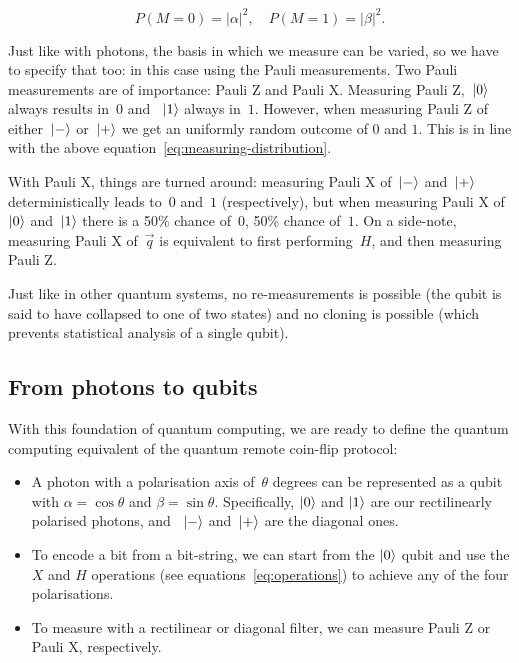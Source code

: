 \documentclass[oneside,a4paper]{article}
\begin{document}
\begin{equation}
    \label{eq:measuring-distribution}
    P(M=0) = |\alpha|^2,
    \quad P(M=1) = |\beta|^2.
\end{equation}

Just like with photons, the basis in which we measure can be varied, so we have to specify that too: in this case using the Pauli measurements. 
Two Pauli measurements are of importance: Pauli Z and Pauli X.
Measuring Pauli Z,~$\ket{0}$ always results in~$0$ and ~$\ket{1}$ always in~$1$.
However, when measuring Pauli Z of either~$\ket{-}$ or~$\ket{+}$ we get an uniformly random outcome of $0$ and $1$. This is in line with the above equation~\ref{eq:measuring-distribution}.

With Pauli X, things are turned around: measuring Pauli X of~$\ket{-}$ and~$\ket{+}$ deterministically leads to~$0$ and~$1$ (respectively), but when measuring Pauli X of~$\ket{0}$ and~$\ket{1}$ there is a 50\% chance of~$0$, 50\% chance of~$1$.
On a side-note, measuring Pauli X of~$\vec{q}$ is equivalent to first performing~$H$, and then measuring Pauli Z.

Just like in other quantum systems, no re-measurements is possible (the qubit is said to have collapsed to one of two states) and no cloning is possible (which prevents statistical analysis of a single qubit).

\subsection{From photons to qubits}
With this foundation of quantum computing, we are ready to define the quantum computing equivalent of the quantum remote coin-flip protocol:

\begin{itemize}
    \item A photon with a polarisation axis of~$\theta$ degrees can be represented as a qubit with $\alpha=\cos{\theta}$ and $\beta=\sin{\theta}$.
    Specifically, $\ket{0}$ and $\ket{1}$ are our rectilinearly polarised photons, and ~$\ket{-}$ and~$\ket{+}$ are the diagonal ones.
    \item To encode a bit from a bit-string, we can start from the $\ket{0}$ qubit and use the $X$ and $H$ operations (see equations~\ref{eq:operations}) to achieve any of the four polarisations.
    \item To measure with a rectilinear or diagonal filter, we can measure Pauli Z or Pauli X, respectively.
\end{itemize}
\end{document}

